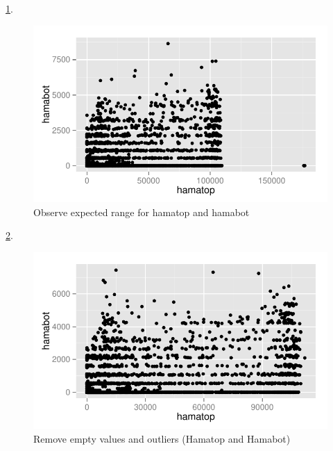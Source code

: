 \documentclass{article}\usepackage[]{graphicx}\usepackage[]{color}
\makeatletter
\def\maxwidth{ %
  \ifdim\Gin@nat@width>\linewidth
    \linewidth
  \else
    \Gin@nat@width
  \fi
}
\newenvironment{knitrout}{}{} %
\makeatother
\begin{document}
\ref{fig:plot_raw_hama}.
\begin{knitrout}
\color{fgcolor}\begin{figure}[h!]


{\centering \includegraphics[width=\maxwidth]{figure/plot_raw_hama} 

}

\caption[Observe expected range for hamatop and hamabot]{Observe expected range for hamatop and hamabot\label{fig:plot_raw_hama}}
\end{figure}


\end{knitrout}

\ref{fig:plot_cleansed_hama}.
\begin{knitrout}
\color{fgcolor}\begin{figure}[h!]


{\centering \includegraphics[width=\maxwidth]{figure/plot_cleansed_hama} 

}

\caption[Remove empty values and outliers (Hamatop and Hamabot)]{Remove empty values and outliers (Hamatop and Hamabot)\label{fig:plot_cleansed_hama}}
\end{figure}


\end{knitrout}
\end{document}
